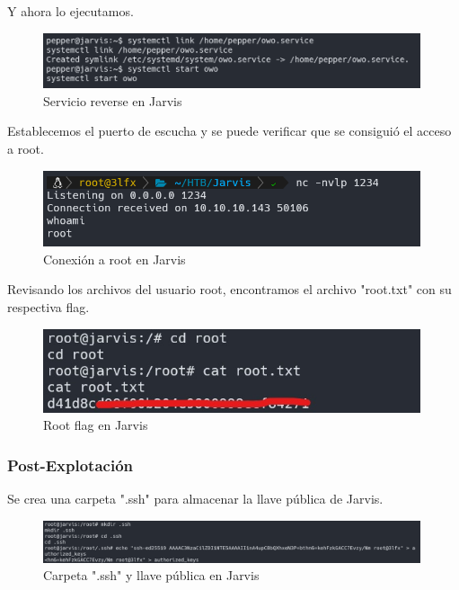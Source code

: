         \large{Y ahora lo ejecutamos.}
        \par
        \begin{figure}[H]
            \centering
            \includegraphics[width=0.99\textwidth]{imagenes/jarvis/24_ejecu_servicio.png}
            \caption{Servicio reverse en Jarvis}
        \end{figure}

        \large{Establecemos el puerto de escucha y se puede verificar que se consiguió el acceso a root.}
        \par
        \begin{figure}[H]
            \centering
            \includegraphics[width=0.99\textwidth]{imagenes/jarvis/25_conect_root_jarvis.png}
            \caption{Conexión a root en Jarvis}
        \end{figure}

        \large{Revisando los archivos del usuario root, encontramos el archivo "root.txt" con su respectiva flag.}
        \par
        \begin{figure}[H]
            \centering
            \includegraphics[width=0.99\textwidth]{imagenes/jarvis/26_root_flag_jarvis.jpg}
            \caption{Root flag en Jarvis}
        \end{figure}

    \subsubsection{Post-Explotación}

        \large{Se crea una carpeta ".ssh" para almacenar la llave pública de Jarvis.}
        \par
        \begin{figure}[H]
            \centering
            \includegraphics[width=0.99\textwidth]{imagenes/jarvis/27_public_key_jarvis.png}
            \caption{Carpeta ".ssh" y llave pública en Jarvis}
        \end{figure}

